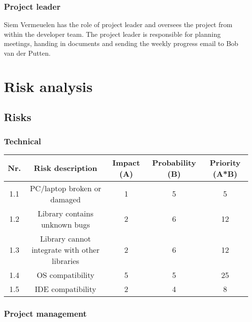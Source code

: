 \documentclass{article} %
\begin{document}
\subsubsection{Project leader}
Siem Vermeuelen has the role of project leader and oversees the project from within the developer team.
The project leader is responsible for planning meetings, handing in documents and sending the weekly progress email to Bob van der Putten.


\newpage

\section{Risk analysis}

\subsection{Risks}

\subsubsection{Technical}

\begin{center}
    \begin{tabular}{|c | c | c | c | c |}
        \hline
        Nr. & Risk description                              & Impact (A) & Probability (B) & Priority (A*B) \\ [0.5ex]
        \hline\hline
        1.1 & PC/laptop broken or damaged                   & 1          & 5               & 5              \\
        \hline
        1.2 & Library contains unknown bugs                 & 2          & 6               & 12             \\
        \hline
        1.3 & Library cannot integrate with other libraries & 2          & 6               & 12             \\
        \hline
        1.4 & OS compatibility                              & 5          & 5               & 25             \\
        \hline
        1.5 & IDE compatibility                             & 2          & 4               & 8              \\
        \hline
    \end{tabular}
\end{center}

\subsubsection{Project management}
\end{document}

